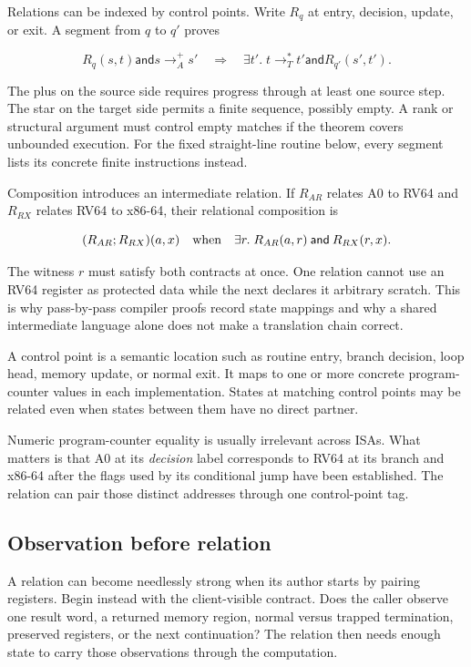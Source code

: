 Relations can be indexed by control points. Write \(R_q\) at entry, decision,
update, or exit. A segment from \(q\) to \(q'\) proves

\[
  R_q(s,t)\mathbin{\mathsf{and}}s\rightarrow_A^{+}s'
  \quad\Longrightarrow\quad
  \exists t'.\;t\rightarrow_T^{*}t'\mathbin{\mathsf{and}}R_{q'}(s',t').
\]

The plus on the source side requires progress through at least one source
step. The star on the target side permits a finite sequence, possibly empty.
A rank or structural argument must control empty matches if the theorem covers
unbounded execution. For the fixed straight-line routine below, every segment
lists its concrete finite instructions instead.

Composition introduces an intermediate relation. If \(R_{AR}\) relates A0 to
RV64 and \(R_{RX}\) relates RV64 to x86-64, their relational composition is

\[
  (R_{AR};R_{RX})(a,x)
  \quad\hbox{when}\quad
  \exists r.\;R_{AR}(a,r)\mathbin{\mathsf{and}}R_{RX}(r,x).
\]

The witness \(r\) must satisfy both contracts at once. One relation cannot use
an RV64 register as protected data while the next declares it arbitrary
scratch. This is why pass-by-pass compiler proofs record state mappings and
why a shared intermediate language alone does not make a translation chain
correct.

\begin{definition}[title={Control points name related moments}]
A control point is a semantic location such as routine entry, branch decision,
loop head, memory update, or normal exit. It maps to one or more concrete
program-counter values in each implementation. States at matching control
points may be related even when states between them have no direct partner.
\end{definition}

Numeric program-counter equality is usually irrelevant across ISAs. What
matters is that A0 at its \emph{decision} label corresponds to RV64 at its
branch and x86-64 after the flags used by its conditional jump have been
established. The relation can pair those distinct addresses through one
control-point tag.

\subsection{Observation before relation}

A relation can become needlessly strong when its author starts by pairing
registers. Begin instead with the client-visible contract. Does the caller
observe one result word, a returned memory region, normal versus trapped
termination, preserved registers, or the next continuation? The relation then
needs enough state to carry those observations through the computation.

